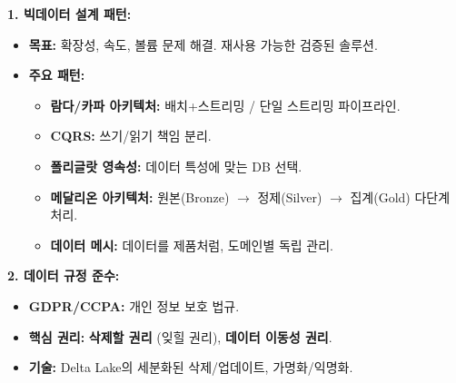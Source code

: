 \documentclass[11pt,a4paper]{article}
\theoremstyle{definition}
\begin{document}
\begin{tcolorbox}[colback=blue!5!white, colframe=blue!75!black, title=\textbf{CSCI103 Lecture 4: 데이터 변환 핵심 요약}]
\textbf{1. 빅데이터 설계 패턴:}
\begin{itemize}
    \item \textbf{목표:} 확장성, 속도, 볼륨 문제 해결. 재사용 가능한 검증된 솔루션.
    \item \textbf{주요 패턴:}
    \begin{itemize}
        \item \textbf{람다/카파 아키텍처:} 배치+스트리밍 / 단일 스트리밍 파이프라인.
        \item \textbf{CQRS:} 쓰기/읽기 책임 분리.
        \item \textbf{폴리글랏 영속성:} 데이터 특성에 맞는 DB 선택.
        \item \textbf{메달리온 아키텍처:} 원본(Bronze) $\rightarrow$ 정제(Silver) $\rightarrow$ 집계(Gold) 다단계 처리.
        \item \textbf{데이터 메시:} 데이터를 제품처럼, 도메인별 독립 관리.
    \end{itemize}
\end{itemize}

\textbf{2. 데이터 규정 준수:}
\begin{itemize}
    \item \textbf{GDPR/CCPA:} 개인 정보 보호 법규.
    \item \textbf{핵심 권리:} \textbf{삭제할 권리} (잊힐 권리), \textbf{데이터 이동성 권리}.
    \item \textbf{기술:} Delta Lake의 세분화된 삭제/업데이트, 가명화/익명화.
\end{itemize}


\end{tcolorbox}
\end{document}
